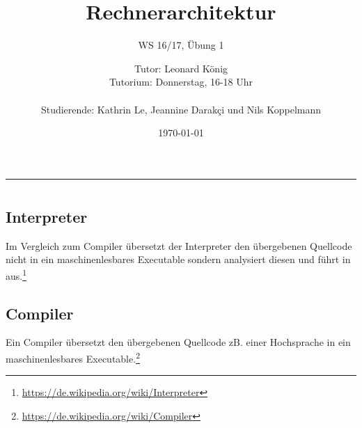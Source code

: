 \documentclass[
	11pt,								%
	parskip=half-,						%
	paper=a4,							%
	english,ngerman,					%
	]{scrartcl}							%
\begin{document}
\begin{titlepage}
	\subject{Jochen Schiller}					%
	\title{Rechnerarchitektur}	%
	\subtitle{\Large WS 16/17, Übung 1}	%
	\author{%
    	Tutor: Leonard König\\			%
        Tutorium: Donnerstag, 16-18 Uhr\\ \\	%
        Studierende: Kathrin Le, Jeannine Darakçi und Nils Koppelmann}		%
	\date{\normalsize \today}					%
\end{titlepage}


\maketitle								%
\vspace*{-11cm}							%

\vspace{8.2cm}							%
\rule{\linewidth}{0.8pt}				%

\section*{}

\subsection*{Interpreter}
Im Vergleich zum Compiler übersetzt der Interpreter den übergebenen Quellcode nicht in ein maschinenlesbares Executable sondern analysiert diesen und führt in aus.\footnote{\url{https://de.wikipedia.org/wiki/Interpreter}}

\subsection*{Compiler}
Ein Compiler übersetzt den übergebenen Quellcode zB. einer Hochsprache in ein maschinenlesbares Executable.\footnote{\url{https://de.wikipedia.org/wiki/Compiler}}
\end{document}
